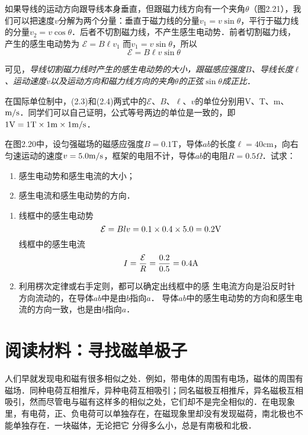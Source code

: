 如果导线的运动方向跟导线本身垂直，但跟磁力线方向有一个夹角$\theta$（图2.21），我们可以把速度$v$分解为两个分量：垂直于磁力线的分量$v_1=v\sin\theta$，平行于磁力线的分量$v_2=v\cos\theta$．后者不切割磁力线，不产生感生电动势．前者切割磁力线，产生的感生电动势为
$\mathcal{E}=B\ell v_1$
而$v_1=v\sin\theta$，所以
\begin{equation}
    \mathcal{E}=B\ell v\sin\theta
\end{equation}

可见，\textit{导线切割磁力线时产生的感生电动势的大小，跟磁感应强度$B$、导线长度$\ell$、运动速度$v$以及运动方向和磁力线方向的夹角$\theta$的正弦$\sin\theta$成正比}．

在国际单位制中，(2.3)和(2.4)两式中的$\mathcal{E}$、$B$、$\ell$、$v$的单位分别用V、T、m、$\text{m}/\text{s}$．同学们可以自己证明，公式等号两边的单位是一致的，即$1{\rm V}=1{\rm T}\times1{\rm m}\times1\text{m}/\text{s}$．

\begin{example}
    在图2.20中，设匀强磁场的磁感应强度$B=0.1$T，导体$ab$的长度$\ell=40$cm，向右匀速运动的速度$v=5.0\text{m}/\text{s}$，框架的电阻不计，导体$ab$的电阻$R=0.5\Omega$．试求：
    \begin{enumerate}
        \item 感生电动势和感生电流的大小；
        \item 感生电流和感生电动势的方向．
    \end{enumerate}
\end{example}

\begin{solution}
\begin{enumerate}
    \item 线框中的感生电动势
\[\mathcal{E}=Blv=0.1\times0.4\times5.0=0.2{\rm V}\]    
线框中的感生电流
\[I=\frac{\mathcal{E}}{R}=\frac{0.2}{0.5}=0.4{\rm A}\]

\item 利用楞次定律或右手定则，都可以确定出线框中的感
生电流方向是沿反时针方向流动的，在导体$ab$中是由$b$指向$a$． 导体$ab$中的感生电动势的方向和感生电流的方向一致，也是由$b$指向$a$．
\end{enumerate}
\end{solution}
   
\section*{阅读材料：寻找磁单极子}
人们早就发现电和磁有很多相似之处．例如，带电体的周围有电场，磁体的周围有磁场．同种电荷互相推斥，异种电荷互相吸引；同名磁极互相推斥，异名磁极互相吸引，然而尽管电与磁有这样多的相似之处，它们却不是完全相似的．在电现象里，有电荷，正、负电荷可以单独存在，在磁现象里却没有发现磁荷，南北极也不能单独存在．一块磁体，无论把它
分得多么小，总是有南极和北极．

